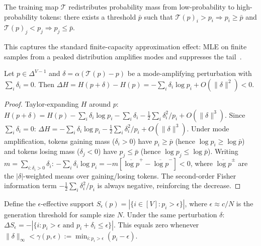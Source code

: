 \begin{assumption}\label{ass:mode_amp}
The training map $\mathcal{T}$ redistributes probability mass from low-probability to high-probability tokens: there exists a threshold $\bar{p}$ such that $\mathcal{T}(p)_i > p_i \Rightarrow p_i \geq \bar{p}$ and $\mathcal{T}(p)_j < p_j \Rightarrow p_j \leq \bar{p}$.
\end{assumption}

This captures the standard finite-capacity approximation effect: MLE on finite samples from a peaked distribution amplifies modes and suppresses the tail~\citep{shumailov2024curse,dohmatob2024tale}.

\begin{proposition}\label{prop:entropy_first}
Let $p \in \Delta^{V-1}$ and $\delta = \alpha(\mathcal{T}(p) - p)$ be a mode-amplifying perturbation with $\sum_i \delta_i = 0$. Then $\Delta H = H(p+\delta) - H(p) = -\sum_i \delta_i \log p_i + O(\|\delta\|^2) < 0$.
\end{proposition}

\begin{proof}
Taylor-expanding $H$ around $p$:
$H(p+\delta) = H(p) - \sum_i \delta_i \log p_i - \sum_i \delta_i - \frac{1}{2}\sum_i \delta_i^2/p_i + O(\|\delta\|^3)$.
Since $\sum_i \delta_i = 0$: $\Delta H = -\sum_i \delta_i \log p_i - \frac{1}{2}\sum_i \delta_i^2/p_i + O(\|\delta\|^3)$.
Under mode amplification, tokens gaining mass ($\delta_i > 0$) have $p_i \geq \bar{p}$ (hence $\log p_i \geq \log \bar{p}$) and tokens losing mass ($\delta_j < 0$) have $p_j \leq \bar{p}$ (hence $\log p_j \leq \log \bar{p}$).
Writing $m = \sum_{i:\delta_i > 0} \delta_i$: $-\sum_i \delta_i \log p_i = -m[\overline{\log p}^{+} - \overline{\log p}^{-}] < 0$, where $\overline{\log p}^{\pm}$ are the $|\delta|$-weighted means over gaining/losing tokens.
The second-order Fisher information term $-\frac{1}{2}\sum_i \delta_i^2/p_i$ is always negative, reinforcing the decrease.
\end{proof}

\begin{proposition}\label{prop:div_threshold}
Define the $\epsilon$-effective support $S_\epsilon(p) = |\{i \in [V]: p_i > \epsilon\}|$, where $\epsilon \approx c/N$ is the generation threshold for sample size $N$.
Under the same perturbation $\delta$: $\Delta S_\epsilon = -|\{i: p_i > \epsilon \text{ and } p_i + \delta_i \leq \epsilon\}|$.
This equals zero whenever $\|\delta\|_\infty < \gamma(p,\epsilon) := \min_{i: p_i > \epsilon}(p_i - \epsilon)$.
\end{proposition}

